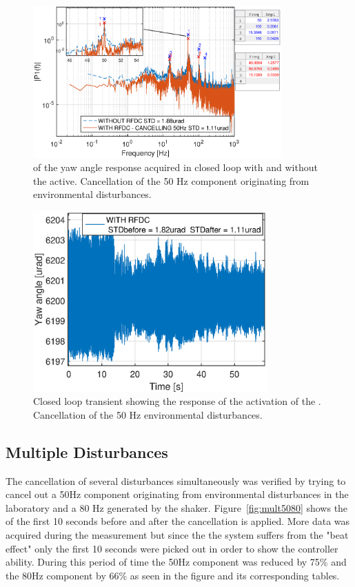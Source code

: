 \begin{figure}[h]
  \centering %
  \includegraphics[width=0.85\textwidth]{fig/matlab/fft_closedloop_50Hz}
  \caption{\label{fig:fft_closedloop_50}\abbrFFT of the yaw angle response acquired in closed loop with and without the \abbrRFDC active. Cancellation of the 50 Hz component originating from environmental disturbances.}
\end{figure}

\begin{figure}[h]
  \centering %
  \includegraphics[width=0.8\textwidth]{fig/matlab/transient_closedloop_50Hz}
  \caption{\label{fig:transient_closedloop_50}Closed loop transient showing the response of the activation of the \abbrRFDC. Cancellation of the 50 Hz environmental disturbances.}
\end{figure}

\FloatBarrier
\subsection{Multiple Disturbances}
The cancellation of several disturbances simultaneously was verified by trying to cancel out a 50Hz component originating from environmental disturbances in the laboratory and a 80 Hz generated by the shaker. Figure~\ref{fig:mult5080} shows the \abbrFFT of the first 10 seconds before and after the cancellation is applied. More data was acquired during the measurement but since the the system suffers from the "beat effect" only the first 10 seconds were picked out in order to show the controller ability. During this period of time the 50Hz component was reduced by 75\% and the 80Hz component by 66\% as seen in the figure and its corresponding tables.

